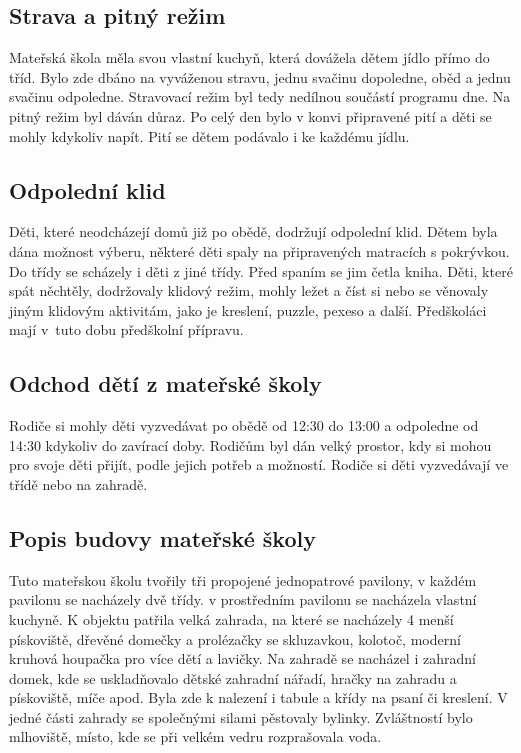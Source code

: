 		\subsection{Strava a pitný režim}
			Mateřská škola měla svou vlastní kuchyň, která dovážela dětem jídlo přímo do tříd. Bylo zde dbáno na vyváženou stravu, jednu svačinu dopoledne, oběd a jednu svačinu odpoledne. Stravovací režim byl tedy nedílnou součástí programu dne. Na pitný režim byl dáván důraz. Po celý den bylo v konvi připravené pití a děti se mohly kdykoliv napít. Pití se dětem podávalo i ke každému jídlu.

		\subsection{Odpolední klid}
			Děti, které neodcházejí domů již po obědě, dodržují odpolední klid. Dětem byla dána možnost výberu, některé děti spaly na připravených matracích s pokrývkou. Do třídy se scházely i děti z jiné třídy. Před spaním se jim četla kniha. Děti, které spát něchtěly, dodržovaly klidový režim, mohly ležet a číst si nebo se věnovaly jiným klidovým aktivitám, jako je kreslení, puzzle, pexeso a další. Předškoláci mají v tuto dobu předškolní přípravu. 


		\subsection{Odchod dětí z mateřské školy}
			Rodiče si mohly děti vyzvedávat po obědě od 12:30 do 13:00 a odpoledne od 14:30 kdykoliv do zavírací doby. Rodičům byl dán velký prostor, kdy si mohou pro svoje děti přijít, podle jejich potřeb a možností. Rodiče si děti vyzvedávají ve třídě nebo na zahradě. 

		\subsection{Popis budovy mateřské školy}

			Tuto mateřskou školu tvořily tři propojené jednopatrové pavilony, v každém pavilonu se nacházely dvě třídy. v prostředním pavilonu se nacházela vlastní kuchyně. K objektu patřila velká zahrada, na které se nacházely 4 menší pískoviště, dřevěné domečky a prolézačky se skluzavkou, kolotoč, moderní kruhová houpačka pro více dětí a lavičky. Na zahradě se nacházel i zahradní domek, kde se uskladňovalo dětské zahradní nářadí, hračky na zahradu a pískoviště, míče apod. Byla zde k nalezení i tabule a křídy na psaní či kreslení. V jedné části zahrady se společnými silami pěstovaly bylinky. Zvláštností bylo mlhoviště, místo, kde se při velkém vedru rozprašovala voda. 

